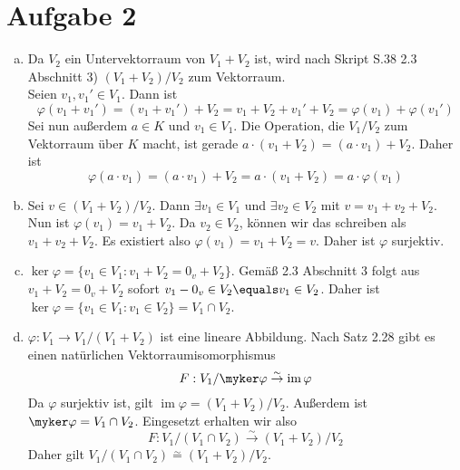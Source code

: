 \documentclass{article}
\begin{document}
	\section*{Aufgabe 2}
	\begin{enumerate}[(a)]
		\item
			Da $V_2$ ein Untervektorraum von $V_1 + V_2$ ist, wird nach Skript S.38 2.3 Abschnitt 3) $(V_1 + V_2)/V_2$ zum Vektorraum.\\
			Seien $v_1, v_1' \in V_1$. Dann ist
			\[\varphi(v_1 + v_1') = (v_1+v_1') + V_2  = v_1 + V_2 + v_1' + V_2 = \varphi(v_1) + \varphi(v_1')\]
			Sei nun außerdem $a\in K$ und $v_1\in V_1$. 
			Die Operation, die $V_1/V_2$ zum Vektorraum über $K$ macht, ist gerade $a\cdot (v_1 + V_2) = (a\cdot v_1) + V_2$. Daher ist
			\[\varphi(a\cdot v_1) = (a\cdot v_1) + V_2 = a \cdot (v_1 + V_2) = a\cdot \varphi(v_1)\]
		\item Sei $v\in (V_1 + V_2)/V_2$. Dann $\exists v_1\in V_1$ und $\exists v_2 \in V_2$ mit $v = v_1 + v_2 + V_2$. 
		Nun ist $\varphi(v_1) = v_1 + V_2$. Da $v_2 \in V_2$, können wir das schreiben als $v_1 + v_2 + V_2$. Es existiert also 
			$\varphi(v_1) = v_1 + V_2 = v$. Daher ist $\varphi$ surjektiv.
		\item $\ker \varphi = \{v_1\in V_1: v_1 + V_2 = 0_v + V_2\}$. 
			Gemäß 2.3 Abschnitt 3 folgt aus $v_1 + V_2 = 0_v + V_2$ sofort $v_1-0_v \in V_2 \equals v_1 \in V_2$.
			Daher ist $\ker \varphi = \{v_1\in V_1: v_1\in V_2\} = V_1\cap V_2$.
		\item $\varphi: V_1 \to V_1/(V_1 + V_2)$ ist eine lineare Abbildung. Nach Satz 2.28 gibt es einen natürlichen Vektorraumisomorphismus
		\[F: V_1/\myker \varphi \overset{\sim}{\to} \operatorname{im} \varphi\]
		Da $\varphi$ surjektiv ist, gilt $\operatorname{im} \varphi = (V_1 + V_2)/V_2$. Außerdem ist $\myker \varphi = V_1\cap V_2$.
		Eingesetzt erhalten wir also 
		\[F: V_1/(V_1\cap V_2) \overset{\sim}{\to} (V_1 + V_2)/V_2\]
		Daher gilt $V_1/(V_1\cap V_2) \overset{\sim}{=} (V_1 + V_2)/V_2$.
	\end{enumerate}		
\end{document}
